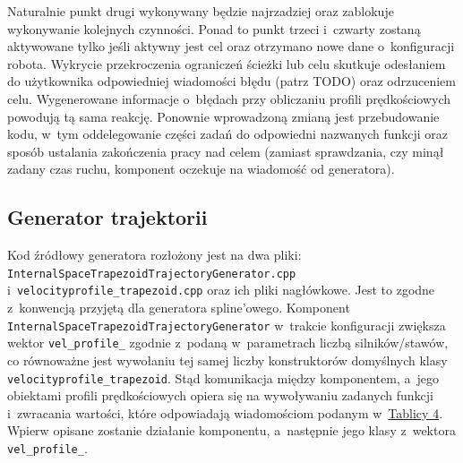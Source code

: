 \documentclass[a4paper, 12pt]{article}
\begin{document}
	Naturalnie punkt drugi wykonywany będzie  najrzadziej oraz zablokuje wykonywanie kolejnych czynności. Ponad to punkt trzeci i~czwarty zostaną aktywowane tylko jeśli aktywny jest cel oraz otrzymano nowe dane o~konfiguracji robota. Wykrycie przekroczenia ograniczeń ścieżki lub celu skutkuje odesłaniem do użytkownika odpowiedniej wiadomości błędu (patrz TODO) oraz odrzuceniem celu. Wygenerowane informacje o~błędach przy obliczaniu profili prędkościowych powodują tą sama reakcję. Ponownie wprowadzoną zmianą jest przebudowanie kodu, w~tym oddelegowanie części zadań do odpowiedni nazwanych funkcji oraz sposób ustalania zakończenia pracy nad celem (zamiast sprawdzania, czy minął zadany czas ruchu, komponent oczekuje na wiadomość od generatora).
	
	\subsection{Generator trajektorii}
	Kod źródłowy generatora rozłożony jest na dwa pliki: \linebreak \texttt{InternalSpaceTrapezoidTrajectoryGenerator.cpp} i~\texttt{velocityprofile\_trapezoid.cpp} oraz ich pliki nagłówkowe. Jest to zgodne z~konwencją przyjętą dla generatora spline'owego. Komponent \texttt{InternalSpaceTrapezoidTrajectoryGenerator} w~trakcie konfiguracji zwiększa wektor \texttt{vel\_profile\_} zgodnie z~podaną w~parametrach liczbą silników/stawów, co równoważne jest wywołaniu tej samej liczby konstruktorów domyślnych klasy \texttt{velocityprofile\_trapezoid}. Stąd komunikacja między komponentem, a~jego obiektami profili prędkościowych opiera się na wywoływaniu zadanych funkcji i~zwracania wartości, które odpowiadają wiadomościom podanym w~\hyperref[tab:resultcodes]{Tablicy 4}. Wpierw opisane zostanie działanie komponentu, a~następnie jego klasy z~wektora \texttt{vel\_profile\_}. 
	
\end{document}

